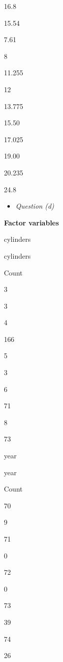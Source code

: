 \documentclass[]{book}
\newenvironment{Shaded}{\begin{snugshade}}{\end{snugshade}}
\newcommand{\DecValTok}[1]{\textcolor[rgb]{0.00,0.00,0.81}{#1}}
\newcommand{\KeywordTok}[1]{\textcolor[rgb]{0.13,0.29,0.53}{\textbf{#1}}}
\newcommand{\NormalTok}[1]{#1}
\newcommand{\OperatorTok}[1]{\textcolor[rgb]{0.81,0.36,0.00}{\textbf{#1}}}
\newcommand{\StringTok}[1]{\textcolor[rgb]{0.31,0.60,0.02}{#1}}
\providecommand{\tightlist}{%
  \setlength{\itemsep}{0pt}\setlength{\parskip}{0pt}}
\begin{document}
16.8

15.54

7.61

8

11.255

12

13.775

15.50

17.025

19.00

20.235

24.8

\begin{itemize}
\tightlist
\item
  \emph{Question (d)}
\end{itemize}

\begin{Shaded}
\end{Shaded}

\textbf{Factor variables}

cylinders

cylinders

Count

3

3

4

166

5

3

6

71

8

73

year

year

Count

70

9

71

0

72

0

73

39

74

26
\end{document}
